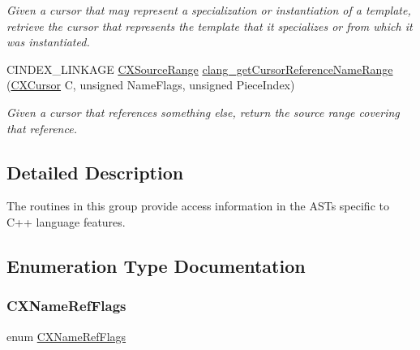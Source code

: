 \begin{DoxyCompactItemize}
\begin{DoxyCompactList}\small\item\em Given a cursor that may represent a specialization or instantiation of a template, retrieve the cursor that represents the template that it specializes or from which it was instantiated. \end{DoxyCompactList}\item 
C\+I\+N\+D\+E\+X\+\_\+\+L\+I\+N\+K\+A\+GE \mbox{\hyperlink{structCXSourceRange}{C\+X\+Source\+Range}} \mbox{\hyperlink{group__CINDEX__CPP_ga8a31e7fc22e41643629394caebf4f04c}{clang\+\_\+get\+Cursor\+Reference\+Name\+Range}} (\mbox{\hyperlink{structCXCursor}{C\+X\+Cursor}} C, unsigned Name\+Flags, unsigned Piece\+Index)
\begin{DoxyCompactList}\small\item\em Given a cursor that references something else, return the source range covering that reference. \end{DoxyCompactList}\end{DoxyCompactItemize}


\subsection{Detailed Description}
The routines in this group provide access information in the A\+S\+Ts specific to C++ language features. 

\subsection{Enumeration Type Documentation}
\mbox{\label{group__CINDEX__CPP_gab9c36c971a7241dccf6a54741b66a5ee}} 
\subsubsection{\texorpdfstring{C\+X\+Name\+Ref\+Flags}{CXNameRefFlags}}
{\footnotesize\ttfamily enum \mbox{\hyperlink{group__CINDEX__CPP_gab9c36c971a7241dccf6a54741b66a5ee}{C\+X\+Name\+Ref\+Flags}}}

